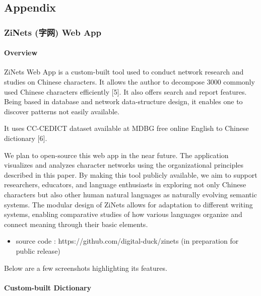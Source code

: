 \documentclass[
]{article}
\providecommand{\tightlist}{%
  \setlength{\itemsep}{0pt}\setlength{\parskip}{0pt}}
\begin{document}
\subsection{Appendix}\label{appendix}

\subsubsection{ZiNets (字网) Web App}\label{zinets-ux5b57ux7f51-web-app}

\paragraph{Overview}\label{overview}

ZiNets Web App is a custom-built tool used to conduct network research
and studies on Chinese characters. It allows the author to decompose
3000 commonly used Chinese characters efficiently {[}5{]}. It also
offers search and report features. Being based in database and network
data-structure design, it enables one to discover patterns not easily
available.

It uses CC-CEDICT dataset available at MDBG free online English to
Chinese dictionary {[}6{]}.

We plan to open-source this web app in the near future. The application
visualizes and analyzes character networks using the organizational
principles described in this paper. By making this tool publicly
available, we aim to support researchers, educators, and language
enthusiasts in exploring not only Chinese characters but also other
human natural languages as naturally evolving semantic systems. The
modular design of ZiNets allows for adaptation to different writing
systems, enabling comparative studies of how various languages organize
and connect meaning through their basic elements.

\begin{itemize}
\tightlist
\item
  source code : https://github.com/digital-duck/zinets (in preparation
  for public release)
\end{itemize}

Below are a few screenshots highlighting its features.

\paragraph{Custom-built Dictionary}\label{custom-built-dictionary}
\end{document}
